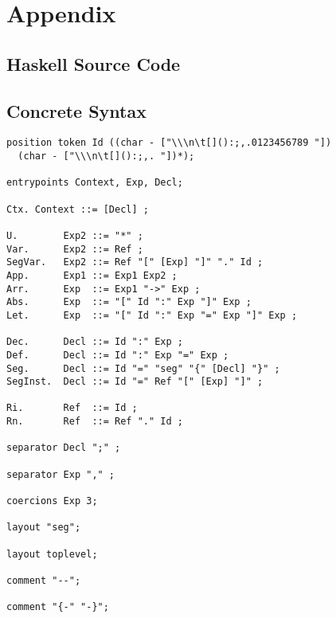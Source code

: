 \chapter{Appendix}

\section{Haskell Source Code} \label{apdix:source-code}

\section{Concrete Syntax} \label{apdix:concrete-syntax}
\begin{verbatim}
position token Id ((char - ["\\\n\t[]():;,.0123456789 "]) 
  (char - ["\\\n\t[]():;,. "])*);

entrypoints Context, Exp, Decl;

Ctx. Context ::= [Decl] ;

U.        Exp2 ::= "*" ;
Var.      Exp2 ::= Ref ;
SegVar.   Exp2 ::= Ref "[" [Exp] "]" "." Id ;
App.      Exp1 ::= Exp1 Exp2 ;
Arr.      Exp  ::= Exp1 "->" Exp ;
Abs.      Exp  ::= "[" Id ":" Exp "]" Exp ;
Let.      Exp  ::= "[" Id ":" Exp "=" Exp "]" Exp ;

Dec.      Decl ::= Id ":" Exp ;
Def.      Decl ::= Id ":" Exp "=" Exp ;
Seg.      Decl ::= Id "=" "seg" "{" [Decl] "}" ;
SegInst.  Decl ::= Id "=" Ref "[" [Exp] "]" ; 

Ri.       Ref  ::= Id ;
Rn.       Ref  ::= Ref "." Id ;

separator Decl ";" ;

separator Exp "," ;

coercions Exp 3;

layout "seg";

layout toplevel;

comment "--";

comment "{-" "-}";
\end{verbatim}

